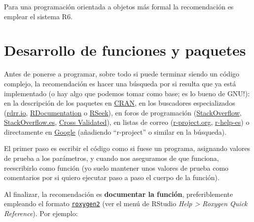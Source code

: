 \documentclass[
]{book}
\theoremstyle{break}
\theoremstyle{nonumberplain}
\begin{document}
Para una programación orientada a objetos más formal la recomendación es emplear el sistema R6.

\section{Desarrollo de funciones y paquetes}\label{desarrollo}

Antes de ponerse a programar, sobre todo si puede terminar siendo un código complejo, la recomendación es hacer una búsqueda por si resulta que ya está implementado (o hay algo que podemos tomar como base; es lo bueno de GNU!): en la descripción de los paquetes en \href{https://cran.r-project.org/web/packages/available_packages_by_date.html}{CRAN}, en los buscadores especializados (\href{https://rdrr.io/}{rdrr.io}, \href{https://www.rdocumentation.org/}{RDocumentation} o \href{http://rseek.org/}{RSeek}), en foros de programación (\href{http://stackoverflow.com/questions/tagged/r}{StackOverflow}, \href{https://es.stackoverflow.com/questions/tagged/r}{StackOverflow.es}, \href{https://stats.stackexchange.com}{Cross Validated}), en listas de correo (\href{https://stat.ethz.ch/mailman/listinfo}{r-project.org}, \href{https://r-help-es.r-project.narkive.com}{r-help-es}) o directamente en \href{https://www.google.com/search?q=r-project}{Google} (añadiendo ``r-project'' o similar en la búsqueda).

El primer paso es escribir el código como si fuese un programa, asignando valores de prueba a los parámetros, y cuando nos aseguramos de que funciona, reescribirlo como función (yo suelo mantener unos valores de prueba como comentarios por si quiero ejecutar paso a paso el cuerpo de la función).

Al finalizar, la recomendación es \textbf{documentar la función}, preferiblemente empleando el formato \href{https://roxygen2.r-lib.org}{\texttt{roxygen2}} (ver el menú de RStudio \emph{Help \textgreater{} Roxygen Quick Reference}).
Por ejemplo:
\end{document}
